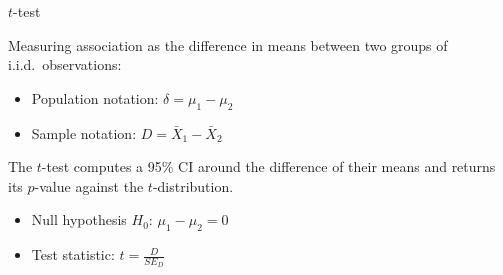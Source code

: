 \documentclass[t]{beamer}
\begin{document}
	\begin{frame}{$t$-test}
		
		\begin{block}{Measuring association as the difference in means between two groups of i.i.d.~observations:}
		
			\begin{itemize}
				\item Population notation:
				$\delta = \mu_1 - \mu_2$

				\item Sample notation:
				$D = \bar X_1 - \bar X_2$
			\end{itemize}

		\end{block}
		
		\begin{block}{The $t$-test computes a 95\% CI around the difference of their means and returns its $p$-value against the $t$-distribution.}
		
			\begin{itemize}
				\item Null hypothesis $H_0$:
				$\mu_1 - \mu_2 = 0$
			
				\item Test statistic:
				$t = \frac{D}{SE_D}$
			\end{itemize}

		\end{block}
		
	\end{frame}
	
\end{document}
